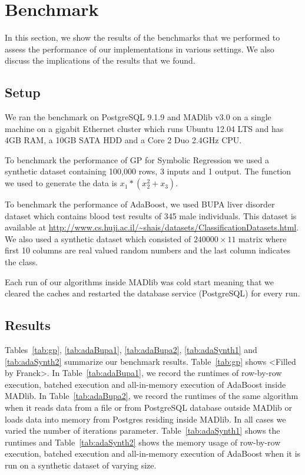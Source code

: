 
\section{Benchmark}
\label{sec:bench}
In this section, we show the results of the benchmarks that we performed to assess the performance of our implementations in various settings. We also discuss the implications of the results that we found.
\subsection{Setup}
We ran the benchmark on PostgreSQL 9.1.9 and MADlib v3.0 on a single machine on a gigabit Ethernet cluster which runs Ubuntu 12.04 LTS and has 4GB RAM, a 10GB SATA HDD and a Core 2 Duo 2.4GHz CPU. 

To benchmark the performance of GP for Symbolic Regression we used a synthetic dataset containing 100,000 rows, 3 inputs and 1 output. The function we used to generate the data is $x_1*(x_2^2+x_3)$.

To benchmark the performance of AdaBoost, we used BUPA liver disorder dataset which contains blood test results of 345 male individuals. This dataset is available at \url{http://www.cs.huji.ac.il/~shais/datasets/ClassificationDatasets.html}. We also used a synthetic dataset which consisted of $240000\times11$ matrix where first 10 columns are real valued random numbers and the last column indicates the class.

Each run of our algorithms inside MADlib was cold start meaning that we cleared the caches and restarted the database service (PostgreSQL) for every run.
\subsection{Results}
Tables~\ref{tab:gp}, \ref{tab:adaBupa1}, \ref{tab:adaBupa2}, \ref{tab:adaSynth1} and \ref{tab:adaSynth2} summarize our benchmark results. Table~\ref{tab:gp} shows <Filled by Franck>. In Table~\ref{tab:adaBupa1}, we record the runtimes of row-by-row execution, batched execution and all-in-memory execution of AdaBoost inside MADlib. In Table~\ref{tab:adaBupa2}, we record the runtimes of the same algorithm when it reads data from a file or from PostgreSQL database outside MADlib or loads data into memory from Postgres residing inside MADlib. In all cases we varied the number of iterations parameter. Table~\ref{tab:adaSynth1} shows the runtimes and Table~\ref{tab:adaSynth2} shows the memory usage of row-by-row execution, batched execution and all-in-memory execution of AdaBoost when it is run on a synthetic dataset of varying size.   


